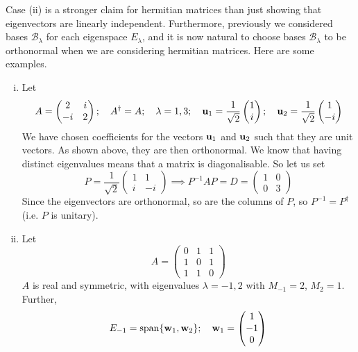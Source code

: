 \documentclass{article}
\begin{document}
Case (ii) is a stronger claim for hermitian matrices than just showing that eigenvectors are linearly independent. Furthermore, previously we considered bases $\mathcal B_\lambda$ for each eigenspace $E_\lambda$, and it is now natural to choose bases $\mathcal B_\lambda$ to be orthonormal when we are considering hermitian matrices. Here are some examples.
\begin{enumerate}[(i)]
    \item Let
          \[ A = \begin{pmatrix}
                  2 & i \\ -i & 2
              \end{pmatrix};\quad A^\dagger = A;\quad \lambda = 1, 3;\quad\vb u_1 = \frac{1}{\sqrt{2}} \begin{pmatrix}
                  1 \\i
              \end{pmatrix};\quad\vb u_2 = \frac{1}{\sqrt{2}} \begin{pmatrix}
                  1 \\-i
              \end{pmatrix} \]
          We have chosen coefficients for the vectors $\vb u_1$ and $\vb u_2$ such that they are unit vectors. As shown above, they are then orthonormal. We know that having distinct eigenvalues means that a matrix is diagonalisable. So let us set
          \[ P =  \frac{1}{\sqrt{2}} \begin{pmatrix}
                  1 & 1 \\ i & -i
              \end{pmatrix} \implies P^{-1}AP = D = \begin{pmatrix}
                  1 & 0 \\ 0 & 3
              \end{pmatrix} \]
          Since the eigenvectors are orthonormal, so are the columns of $P$, so $P^{-1} = P^\dagger$ (i.e. $P$ is unitary).
    \item Let
          \[ A = \begin{pmatrix}
                  0 & 1 & 1 \\ 1 & 0 & 1 \\ 1 & 1 & 0
              \end{pmatrix} \]
          $A$ is real and symmetric, with eigenvalues $\lambda = -1, 2$ with $M_{-1} = 2$, $M_2 = 1$. Further,
          \[ E_{-1} = \operatorname{span} \{ \vb w_1, \vb w_2 \};\quad \vb w_1 = \begin{pmatrix}
                  1 \\ -1 \\ 0

\end{pmatrix}\]
\end{enumerate}
\end{document}
